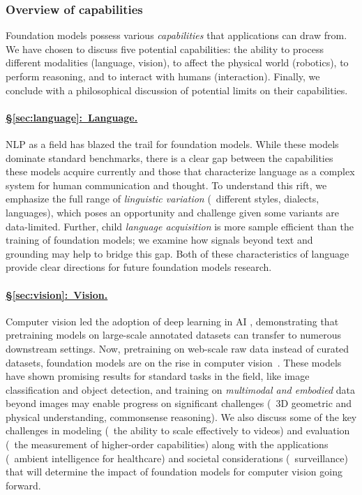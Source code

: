 \subsubsection{Overview of capabilities}

Foundation models possess various \emph{capabilities} that applications can draw from.
We have chosen to discuss five potential capabilities:
the ability to process different modalities (\eg language, vision), to affect
the physical world (robotics), to perform reasoning, and to interact with
humans (interaction).  Finally, we conclude with a philosophical discussion of potential limits on their capabilities.

\paragraph{\hyperref[sec:language]{§\ref{sec:language}:~Language.}}

NLP as a field has blazed the trail for foundation models.
While these models dominate standard benchmarks, there is a clear gap between the capabilities these models acquire currently and those that characterize language as a complex system for human communication and thought.
To understand this rift, we emphasize the full range of \textit{linguistic variation} (\eg~different styles, dialects, languages), which poses an opportunity and challenge given some variants are data-limited.
Further, child \textit{language acquisition} is more sample efficient than the training of foundation models; we examine how signals beyond text and grounding may help to bridge this gap.
Both of these characteristics of language provide clear directions for future foundation models research.

\paragraph{\hyperref[sec:vision]{§\ref{sec:vision}:~Vision.}}
Computer vision led the adoption of deep learning in AI \cite{russakovsky2015imagenet}, demonstrating that pretraining models on large-scale annotated datasets can transfer to numerous downstream settings.
Now, pretraining on web-scale raw data instead of curated datasets, foundation models are on the rise in computer vision~\citep[\eg][]{radford2021learning}.
These models have shown promising results for standard tasks in the field, like image classification and object detection, and training on \textit{multimodal and embodied} data beyond images may enable progress on significant challenges (\eg~3D geometric and physical understanding, commonsense reasoning).
We also discuss some of the key challenges in modeling (\eg~the ability to scale effectively to videos) and evaluation (\eg~the measurement of higher-order capabilities) along with the applications (\eg~ambient intelligence for healthcare) and societal considerations (\eg~surveillance) that will determine the impact of foundation models for computer vision going forward.

